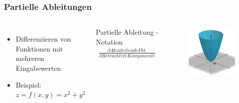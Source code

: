 \begin{frame}
\frametitle{Partielle Ableitungen}

\begin{columns}

\begin{itemize}
\item Differenzieren von Funktionen mit mehreren Eingabewerten
\item Beispiel: $z = f(x, y) = x^2 + y^2$
\end{itemize}

\hspace{2mm}

\begin{block}{Partielle Ableitung - Notation}
\begin{align*}
\frac{\partial Abzuleitende Fkt.}{\partial Betrachtete Komponente}
\end{align*}
\end{block}

\begin{figure}
\includegraphics[width=\linewidth]{./geschichtliches/adeline/img/partAbl_1_alpha}
\end{figure}

\end{columns}



\end{frame}
